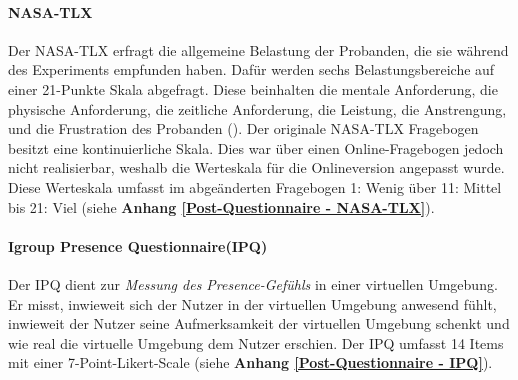 \documentclass[a4paper,11pt]{article}%
\renewcommand{\\}{\vspace*{0.5\baselineskip} \newline}
\begin{document}

		\paragraph{NASA-TLX}
Der NASA-TLX erfragt die allgemeine Belastung der Probanden, die sie während des Experiments empfunden haben. Dafür werden sechs Belastungsbereiche auf einer 21-Punkte Skala abgefragt. Diese beinhalten die mentale Anforderung, die physische Anforderung, die zeitliche Anforderung, die Leistung, die Anstrengung, und die Frustration des Probanden (\citep{NASATLX}).
Der originale NASA-TLX Fragebogen besitzt eine kontinuierliche Skala. Dies war über einen Online-Fragebogen jedoch nicht realisierbar, weshalb die Werteskala für die Onlineversion angepasst wurde. Diese Werteskala umfasst im abgeänderten Fragebogen 1: \dq{}Wenig \dq{} über 11: \dq{}Mittel \dq{} bis 21: \dq{}Viel \dq{} (siehe \textbf{Anhang \ref{Post-Questionnaire - NASA-TLX}}).

		\paragraph{Igroup Presence Questionnaire(IPQ)}
Der IPQ dient zur \textit{Messung des Presence-Gefühls} in einer virtuellen Umgebung. Er misst, inwieweit sich der Nutzer in der virtuellen Umgebung anwesend fühlt, inwieweit der Nutzer seine Aufmerksamkeit der virtuellen Umgebung schenkt und wie real die virtuelle Umgebung dem Nutzer erschien. Der IPQ umfasst 14 Items mit einer 7-Point-Likert-Scale (siehe \textbf{Anhang \ref{Post-Questionnaire - IPQ}}).
		
\end{document}
